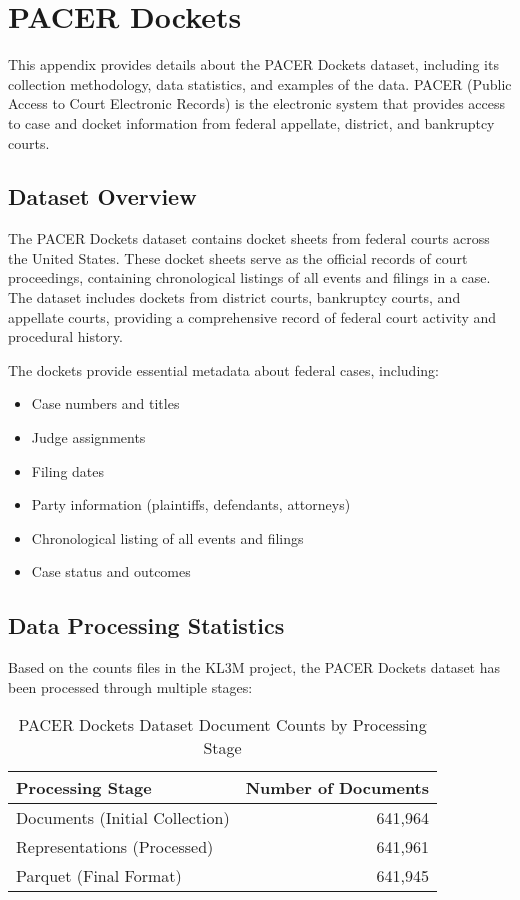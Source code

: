 \section{PACER Dockets}
\label{appendix:dockets}

This appendix provides details about the PACER Dockets dataset, including its collection methodology, data statistics, and examples of the data. PACER (Public Access to Court Electronic Records) is the electronic system that provides access to case and docket information from federal appellate, district, and bankruptcy courts.

\subsection{Dataset Overview}

The PACER Dockets dataset contains docket sheets from federal courts across the United States. These docket sheets serve as the official records of court proceedings, containing chronological listings of all events and filings in a case. The dataset includes dockets from district courts, bankruptcy courts, and appellate courts, providing a comprehensive record of federal court activity and procedural history.

The dockets provide essential metadata about federal cases, including:
\begin{itemize}
  \item Case numbers and titles
  \item Judge assignments
  \item Filing dates
  \item Party information (plaintiffs, defendants, attorneys)
  \item Chronological listing of all events and filings
  \item Case status and outcomes
\end{itemize}

\subsection{Data Processing Statistics}

Based on the counts files in the KL3M project, the PACER Dockets dataset has been processed through multiple stages:

\begin{table}[h]
\centering
\begin{tabular}{|l|r|}
\hline
\textbf{Processing Stage} & \textbf{Number of Documents} \\
\hline
Documents (Initial Collection) & 641,964 \\
Representations (Processed) & 641,961 \\
Parquet (Final Format) & 641,945 \\
\hline
\end{tabular}
\caption{PACER Dockets Dataset Document Counts by Processing Stage}
\label{tab:dockets_counts}
\end{table}

